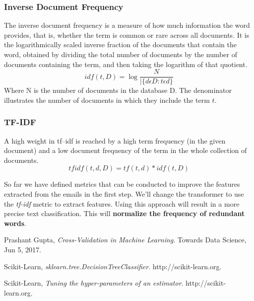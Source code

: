 \documentclass[12pt]{article}
\numberwithin{equation}{section}
\numberwithin{table}{section}
\numberwithin{figure}{section}
\begin{document}
\subsubsection{Inverse Document Frequency}
The inverse document frequency is a measure of how much information the word provides, that is, whether the term is common or rare across all documents. It is the logarithmically scaled inverse fraction of the documents that contain the word, obtained by dividing the total number of documents by the number of documents containing the term, and then taking the logarithm of that quotient.
$$
	idf(t, D) = \log \frac{N}{|\{d \epsilon D: t \epsilon d\}}
$$
Where N is the number of documents in the database D. The denominator illustrates the number of documents in which they include the term $t$.

\subsubsection{TF-IDF}
A high weight in tf–idf is reached by a high term frequency (in the given document) and a low document frequency of the term in the whole collection of documents.
$$
	tfidf(t, d, D) = tf(t, d) * idf(t, D)
$$

So far we have defined metrics that can be conducted to improve the features extracted from the emails in the first step. We'll change the transformer to use the \textit{tf-idf} metric to extract features. Using this approach will result in a more precise text classification. This will \textbf{normalize the frequency of redundant words}.
\begin{python}
	
\end{python}
\begin{thebibliography}{999}
	
	Prashant Gupta,
	\emph{Cross-Validation in Machine Learning}.
	Towards Data Science,
	Jun 5, 2017.
	
	Scikit-Learn,
	\emph{sklearn.tree.DecisionTreeClassifier}.
	http://scikit-learn.org.
	
	Scikit-Learn,
	\emph{Tuning the hyper-parameters of an estimator}.
	http://scikit-learn.org.
	
\end{thebibliography}
\end{document}
